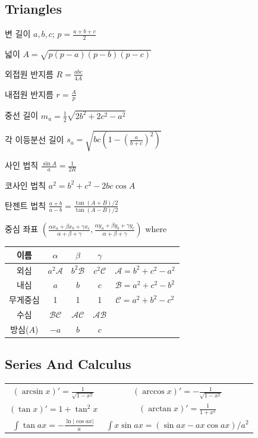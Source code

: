 \subsection{Triangles}
변 길이 $a,b,c$; $p=\frac{a+b+c}{2}$

넓이 $A=\sqrt{p(p-a)(p-b)(p-c)}$

외접원 반지름 $R=\frac{abc}{4A}$

내접원 반지름 $r=\frac{A}{p}$

중선 길이 $m_a = \frac{1}{2} \sqrt{2b^2+2c^2-a^2}$

각 이등분선 길이 $s_a = \sqrt{bc(1-(\frac{a}{b+c})^2)}$

사인 법칙 $\frac{\sin A}{a}=\frac{1}{2R}$

코사인 법칙 $a^2=b^2+c^2-2bc \cos A$

탄젠트 법칙 $\frac{a+b}{a-b} = \frac{\tan (A+B)/2}{\tan (A-B)/2}$

중심 좌표 $(\frac{\alpha x_a + \beta x_b + \gamma x_c}{\alpha+\beta+\gamma}, \frac{\alpha y_a + \beta y_b + \gamma y_c}{\alpha+\beta+\gamma})$ where

\begin{tabular}{|c||c|c|c||c|}
    \hline
    이름 & $\alpha$ & $\beta$ & $\gamma$ & \\
    \hline
    외심 & $a^2 \mathcal{A}$ & $b^2 \mathcal{B}$ & $c^2 \mathcal{C}$ & $\mathcal{A} = b^2+c^2-a^2$\\
    내심 & $a$ & $b$ & $c$ & $\mathcal{B} = a^2+c^2-b^2$ \\
    무게중심 & 1 & 1 & 1 & $\mathcal{C} = a^2+b^2-c^2$\\
    수심 & $\mathcal{BC}$ & $\mathcal{AC}$ & $\mathcal{AB}$ & \\
    방심($A$) & $-a$ & $b$ & $c$ & \\
    \hline
\end{tabular}

\subsection{Series And Calculus}

\begin{tabular}{c|c}
    \hline
    $(\arcsin x)' = \frac{1}{\sqrt{1-x^2}}$ & $(\arccos x)' = -\frac{1}{\sqrt{1-x^2}}$ \\
    $(\tan x)' = 1 + \tan^2 x$ & $(\arctan x)' = \frac{1}{1+x^2}$ \\
    $\int{\tan ax} = -\frac{\ln |\cos ax|}{a}$ & $\int{x \sin ax} = (\sin ax - ax \cos ax)/a^2$ \\
    \hline
\end{tabular}

